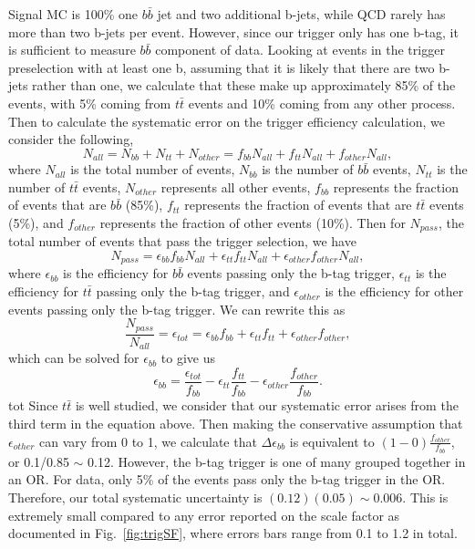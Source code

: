 Signal MC is 100\% one $b\bar{b}$ jet and two additional b-jets, while QCD rarely has more than two b-jets per event. However, since our trigger only has one b-tag, it is sufficient to measure $b\bar{b}$ component of data. Looking at events in the trigger preselection with at least one b, assuming that it is likely that there are two b-jets rather than one, we calculate that these make up approximately 85\% of the events, with 5\% coming from $t\bar{t}$ events and 10\% coming from any other process. Then to calculate the systematic error on the trigger efficiency calculation, we consider the following,
\begin{equation}
N_{all} = N_{bb} + N_{tt} + N_{other} = f_{bb}N_{all} + f_{tt}N_{all} + f_{other}N_{all},
\end{equation}
where $N_{all}$ is the total number of events, $N_{bb}$ is the number of $b\bar{b}$ events, $N_{tt}$ is the number of $t\bar{t}$ events, $N_{other}$ represents all other events, $f_{bb}$ represents the fraction of events that are $b\bar{b}$ (85\%), $f_{tt}$ represents the fraction of events that are $t\bar{t}$ events (5\%), and $f_{other}$ represents the fraction of other events (10\%). Then for $N_{pass}$, the total number of events that pass the trigger selection, we have
\begin{equation}
N_{pass} = \epsilon_{bb}f_{bb}N_{all} + \epsilon_{tt}f_{tt}N_{all} + \epsilon_{other}f_{other}N_{all},
\end{equation}
 where $\epsilon_{bb}$ is the efficiency for $b\bar{b}$ events passing only the b-tag trigger, $\epsilon_{tt}$ is the efficiency for $t\bar{t}$ passing only the b-tag trigger, and $\epsilon_{other}$ is the efficiency for other events passing only the b-tag trigger. We can rewrite this as
 \begin{equation}
 \frac{N_{pass}}{N_{all}} = \epsilon_{tot} = \epsilon_{bb}f_{bb} + \epsilon_{tt}f_{tt} + \epsilon_{other}f_{other},
 \end{equation}
 which can be solved for $\epsilon_{bb}$ to give us
 \begin{equation}
 \epsilon_{bb} = \frac{\epsilon_{tot}}{f_{bb}} - \epsilon_{tt}\frac{f_{tt}}{f_{bb}} - \epsilon_{other}\frac{f_{other}}{f_{bb}}.
 \end{equation}tot
Since $t\bar{t}$ is well studied, we consider that our systematic error arises from the third term in the equation above. Then making the conservative assumption that $\epsilon_{other}$ can vary from 0 to 1, we calculate that $\Delta\epsilon_{bb}$ is equivalent to $(1 - 0)\frac{f_{other}}{f_{bb}}$, or 0.1/0.85 $\sim$ 0.12. However, the b-tag trigger is one of many grouped together in an OR. For data, only 5\% of the events pass only the b-tag trigger in the OR. Therefore, our total systematic uncertainty is $(0.12)( 0.05) \sim 0.006$. This is extremely small compared to any error reported on the scale factor as documented in Fig.~\ref{fig:trigSF}, where errors bars range from 0.1 to 1.2 in total.

